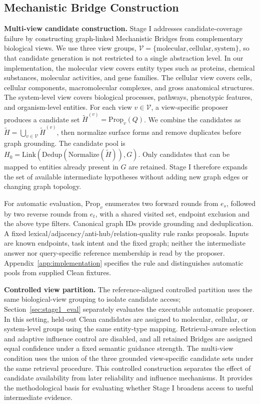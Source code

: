 \documentclass{article} %
\begin{document}
\subsection{Mechanistic Bridge Construction}
\label{sec:bridge_construction}
\textbf{Multi-view candidate construction.} Stage I addresses candidate-coverage failure by constructing graph-linked Mechanistic Bridges from complementary biological views. We use three view groups, $\mathcal{V}=\{\text{molecular},\text{cellular},\text{system}\}$, so that candidate generation is not restricted to a single abstraction level. In our implementation, the molecular view covers entity types such as proteins, chemical substances, molecular activities, and gene families. The cellular view covers cells, cellular components, macromolecular complexes, and gross anatomical structures. The system-level view covers biological processes, pathways, phenotypic features, and organism-level entities. For each view $v\in\mathcal{V}$, a view-specific proposer produces a candidate set $\tilde{H}^{(v)}=\mathrm{Prop}_v(Q)$. We combine the candidates as $\tilde{H}=\bigcup_{v\in\mathcal{V}}\tilde{H}^{(v)}$, then normalize surface forms and remove duplicates before graph grounding. The candidate pool is $H_0=\mathrm{Link}(\mathrm{Dedup}(\mathrm{Normalize}(\tilde{H})),G)$. Only candidates that can be mapped to entities already present in $G$ are retained. Stage I therefore expands the set of available intermediate hypotheses without adding new graph edges or changing graph topology.

For automatic evaluation, $\mathrm{Prop}_v$ enumerates two forward rounds from $e_s$, followed by two reverse rounds from $e_t$, with a shared visited set, endpoint exclusion and the above type filters. Canonical graph IDs provide grounding and deduplication. A fixed lexical/adjacency/anti-hub/relation-quality rule ranks proposals. Inputs are known endpoints, task intent and the fixed graph; neither the intermediate answer nor query-specific reference membership is read by the proposer. Appendix~\ref{app:implementation} specifies the rule and distinguishes automatic pools from supplied Clean fixtures.

\noindent\textbf{Controlled view partition.} 
The reference-aligned controlled partition uses the same biological-view grouping to isolate candidate access; Section~\ref{sec:stage1_eval} separately evaluates the executable automatic proposer. In this setting, held-out Clean candidates are assigned to molecular, cellular, or system-level groups using the same entity-type mapping. Retrieval-aware selection and adaptive influence control are disabled, and all retained Bridges are assigned equal confidence under a fixed semantic guidance strength. The multi-view condition uses the union of the three grounded view-specific candidate sets under the same retrieval procedure. This controlled construction separates the effect of candidate availability from later reliability and influence mechanisms. It provides the methodological basis for evaluating whether Stage I broadens access to useful intermediate evidence.
\end{document}
